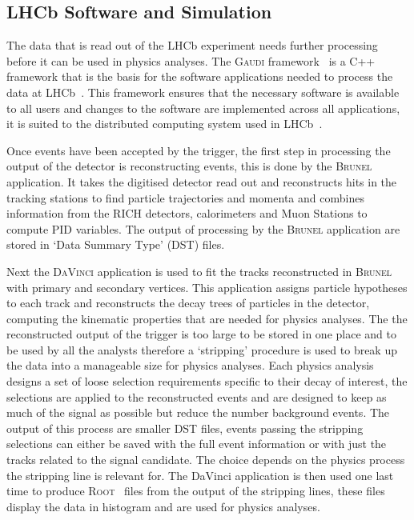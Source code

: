 \subsection{LHCb Software and Simulation}
\label{Software_Simulation}

The data that is read out of the LHCb experiment needs further processing before it can be used in physics analyses. The \textsc{Gaudi} framework~\cite{Mato:1998gfa} is a C++ framework that is the basis for the software applications needed to process the data at LHCb~\cite{Antunes-Nobrega:835156}. This framework ensures that the necessary software is available to all users and changes to the software are implemented across all applications, it is suited to the distributed computing system used in LHCb~\cite{Stagni:2012rs}. 


Once events have been accepted by the trigger, the first step in processing the output of the detector is reconstructing events, this is done by the \textsc{Brunel} application. It takes the digitised detector read out and reconstructs hits in the tracking stations to find particle trajectories and momenta and combines information from the RICH detectors, calorimeters and Muon Stations to compute PID variables. The output of processing by the \textsc{Brunel} application are stored in `Data Summary Type' (DST) files. 

Next the \textsc{DaVinci} application is used to fit the tracks reconstructed in \textsc{Brunel} with primary and secondary vertices. This application assigns particle hypotheses to each track and reconstructs the decay trees of particles in the detector, computing the kinematic properties that are needed for physics analyses. The the reconstructed output of the trigger is too large to be stored in one place and to be used by all the analysts therefore a `stripping' procedure is used to break up the data into a manageable size for physics analyses. Each physics analysis designs a set of loose selection requirements specific to their decay of interest, the selections are applied to the reconstructed events and are designed to keep as much of the signal as possible but reduce the number background events. The output of this process are smaller DST files, events passing the stripping selections can either be saved with the full event information or with just the tracks related to the signal candidate. The choice depends on the physics process the stripping line is relevant for. The DaVinci application is then used one last time to produce \textsc{Root}~\cite{Brun:1997pa} files from the output of the stripping lines, these files display the data in histogram and are used for physics analyses. %


